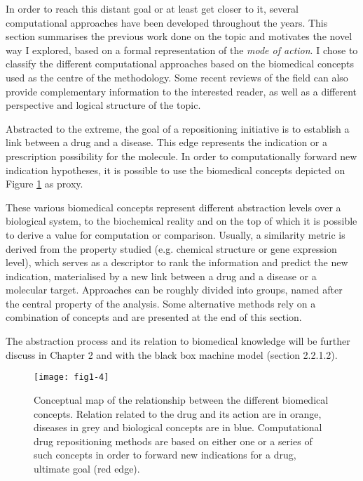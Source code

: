 In order to reach this distant goal or at least get closer to it, several computational approaches have been developed throughout the years. This section summarises the previous work done on the topic and motivates the novel way I explored, based on a formal representation of the \emph{mode of action}. I chose to classify the different computational approaches based on the biomedical concepts used as the centre of the methodology. Some recent reviews \citep{ashburn2004drug} \citep{dudley2011exploiting} \citep{hurle2013computational} of the field can also provide complementary information to the interested reader, as well as a different perspective and logical structure of the topic.

Abstracted to the extreme, the goal of a repositioning initiative is to establish a link between a drug and a disease. This edge represents the indication or a prescription possibility for the molecule. In order to computationally forward new indication hypotheses, it is possible to use the biomedical concepts depicted on Figure \ref{fig1-4} as proxy.

These various biomedical concepts represent different abstraction levels over a biological system, to the biochemical reality and on the top of which it is possible to derive a value for computation or comparison.
Usually, a similarity metric is derived from the property studied (e.g. chemical structure or gene expression level), which serves as a descriptor to rank the information and predict the new indication, materialised by a new link between a drug and a disease or a molecular target. Approaches can be roughly divided into groups, named after the central property of the analysis. Some alternative methods rely on a combination of concepts and are presented at the end of this section.

The abstraction process and its relation to biomedical knowledge will be further discuss in Chapter 2 and with the black box machine model (section 2.2.1.2).

\begin{figure}[ht]
    \centering
    \texttt{[image: fig1-4]}
    \caption{Conceptual map of the relationship between the different biomedical concepts. Relation related to the drug and its action are in orange, diseases in grey and biological concepts are in blue. Computational drug repositioning methods are based on either one or a series of such concepts in order to forward new indications for a drug, ultimate goal (red edge).}
    \label{fig1-4}
\end{figure}

